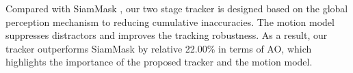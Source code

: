 Compared with SiamMask \cite{Wang2018SiamMask}, our two stage tracker is designed based on the global perception mechanism to reducing cumulative inaccuracies. The motion model suppresses distractors and improves the tracking robustness. As a result, our tracker outperforms SiamMask by relative 22.00\% in terms of AO, which highlights the importance of the proposed tracker and the motion model.

